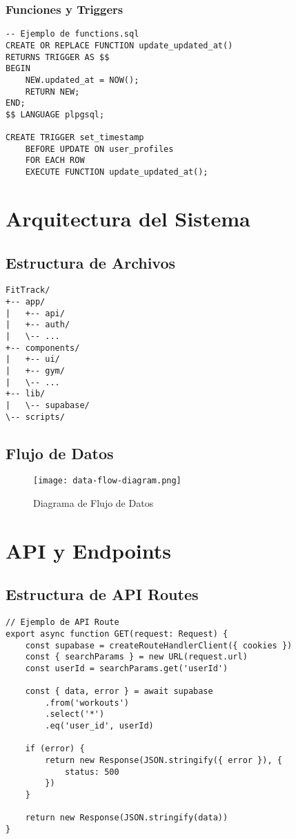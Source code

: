 \documentclass[12pt,a4paper]{report}
\begin{document}
\subsection{Funciones y Triggers}
\begin{verbatim}
-- Ejemplo de functions.sql
CREATE OR REPLACE FUNCTION update_updated_at()
RETURNS TRIGGER AS $$
BEGIN
    NEW.updated_at = NOW();
    RETURN NEW;
END;
$$ LANGUAGE plpgsql;

CREATE TRIGGER set_timestamp
    BEFORE UPDATE ON user_profiles
    FOR EACH ROW
    EXECUTE FUNCTION update_updated_at();
\end{verbatim}

\chapter{Arquitectura del Sistema}

\section{Estructura de Archivos}
\begin{verbatim}
FitTrack/
+-- app/
|   +-- api/
|   +-- auth/
|   \-- ...
+-- components/
|   +-- ui/
|   +-- gym/
|   \-- ...
+-- lib/
|   \-- supabase/
\-- scripts/
\end{verbatim}

\section{Flujo de Datos}
\begin{figure}[h]
\centering
\texttt{[image: data-flow-diagram.png]}
\caption{Diagrama de Flujo de Datos}
\end{figure}

\chapter{API y Endpoints}

\section{Estructura de API Routes}
\begin{verbatim}
// Ejemplo de API Route
export async function GET(request: Request) {
    const supabase = createRouteHandlerClient({ cookies })
    const { searchParams } = new URL(request.url)
    const userId = searchParams.get('userId')
    
    const { data, error } = await supabase
        .from('workouts')
        .select('*')
        .eq('user_id', userId)
        
    if (error) {
        return new Response(JSON.stringify({ error }), {
            status: 500
        })
    }
    
    return new Response(JSON.stringify(data))
}
\end{verbatim}
\end{document}
